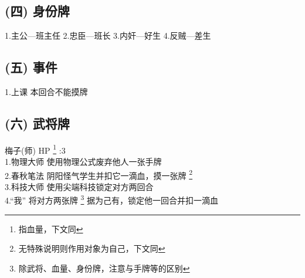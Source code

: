 \documentclass[UTF-8]{ctexart}
\begin{document}
\subsection*{(四)   身份牌}

\begin{flushleft}
1.主公---班主任 \hspace{0.4cm} 2.忠臣---班长 \hspace{0.4cm} 3.内奸---好生 \hspace{0.4cm} 4.反贼---差生\\
\end{flushleft}

\newpage

\subsection*{(五)   事件}

\begin{flushleft}
1.上课 \space 本回合不能摸牌
\end{flushleft}

\newpage

\subsection*{(六)   武将牌}
梅子(师) \space HP \footnote[1]{指血量，下文同} :3\\
{\noindent}1.物理大师 \space 使用物理公式废弃他人一张手牌\\
{\noindent}2.春秋笔法 \space 阴阳怪气学生并扣它一滴血，摸一张牌 \footnote[2]{无特殊说明则作用对象为自己，下文同} \\
{\noindent}3.科技大师 \space 使用尖端科技锁定对方两回合\\
{\noindent}4.``我'' \space 将对方两张牌 \footnote[3]{除武将、血量、身份牌，注意与手牌等的区别} 据为己有，锁定他一回合并扣一滴血
\end{document}
